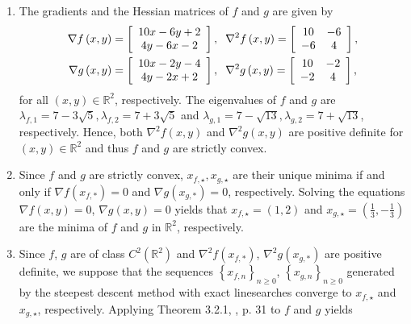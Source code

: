 \documentclass[a4paper]{article}
\numberwithin{equation}{section}
\begin{document}
\begin{enumerate}
\item The gradients and the Hessian matrices of $f$ and $g$ are given by
\begin{align}
\nabla f\left( {x,y} \right) &= \left[ {\begin{array}{*{20}{c}}
{10x - 6y + 2}\\
{4y - 6x - 2}
\end{array}} \right], \hspace*{0.2cm} {\nabla ^2}f\left( {x,y} \right) = \left[ {\begin{array}{*{20}{c}}
{10}&{ - 6}\\
{ - 6}&4
\end{array}} \right],\\
\nabla g\left( {x,y} \right) &= \left[ {\begin{array}{*{20}{c}}
{10x - 2y - 4}\\
{4y - 2x + 2}
\end{array}} \right], \hspace*{0.2cm} {\nabla ^2}g\left( {x,y} \right) = \left[ {\begin{array}{*{20}{c}}
{10}&{ - 2}\\
{ - 2}&4
\end{array}} \right],
\end{align}
for all $\left(x,y\right)\in \mathbb{R}^2$, respectively. The eigenvalues of $f$ and $g$ are ${\lambda _{f,1}} = 7 - 3\sqrt 5 ,{\lambda _{f,2}} = 7 + 3\sqrt 5$ and  ${\lambda _{g,1}} = 7 - \sqrt {13} ,{\lambda _{g,2}} = 7 + \sqrt {13}$, respectively. Hence, both ${\nabla ^2}f\left( {x,y} \right)$ and ${\nabla ^2}g\left( {x,y} \right)$ are positive definite for $\left(x,y\right) \in \mathbb{R}^2$ and thus $f$ and $g$ are strictly convex. 
\item Since $f$ and $g$ are strictly convex, ${x_{f,\star}},{x_{g,\star}}$ are their unique minima if and only if $\nabla f\left( {{x_{f,*}}} \right) = 0$ and $\nabla g\left( {{x_{g,*}}} \right) = 0$, respectively. Solving the equations $\nabla f\left( {x,y} \right) = 0$, $\nabla g\left( {x,y} \right) = 0$ yields that $x_{f,\star}=\left(1,2\right)$ and $x_{g,\star} = \left(\frac{1}{3},-\frac{1}{3}\right)$ are the minima of $f$ and $g$ in $\mathbb{R}^2$, respectively. 
\item Since $f$, $g$ are of class $C^2\left(\mathbb{R}^2\right)$ and ${\nabla ^2}f\left( {{x_{f,*}}} \right)$, ${\nabla ^2}g\left( {{x_{g,*}}} \right)$ are positive definite, we suppose that the sequences ${\left\{ {{x_{f,n}}} \right\}_{n \ge 0}}$, ${\left\{ {{x_{g,n}}} \right\}_{n \ge 0}}$ generated by the steepest descent method with exact linesearches converge to $x_{f,\star}$ and $x_{g,\star}$, respectively. Applying Theorem 3.2.1, \cite{2}, p. 31 to $f$ and $g$ yields

\end{enumerate}
\end{document}
